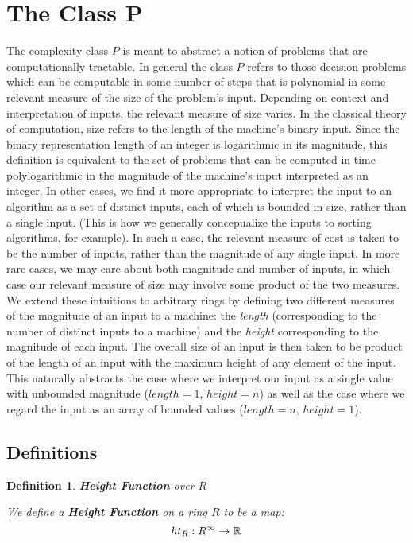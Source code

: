 \documentclass[twoside]{article}
\newtheorem{definition}{Definition}[section]
\begin{document}
\section{The Class P}

The complexity class $P$ is meant to abstract a notion of problems
that are computationally tractable.  In general the class $P$ refers
to those decision problems which can be computable in some number of
steps that is polynomial in some relevant measure of the size of the
problem's input.  Depending on context and interpretation of inputs,
the relevant measure of size varies. In the classical theory of
computation, size refers to the length of the machine's binary input.
Since the binary representation length of an integer is logarithmic in
its magnitude, this definition is equivalent to the set of problems
that can be computed in time polylogarithmic in the magnitude of the
machine's input interpreted as an integer.  In other cases, we find it
more appropriate to interpret the input to an algorithm as a set of
distinct inputs, each of which is bounded in size, rather than a
single input.  (This is how we generally concepualize the inputs to
sorting algorithms, for example).  In such a case, the relevant
measure of cost is taken to be the number of inputs, rather than the
magnitude of any single input.  In more rare cases, we may care about
both magnitude and number of inputs, in which case our relevant measure
of size may involve some product of the two measures.\\

We extend these intuitions to arbitrary rings by defining two
different measures of the magnitude of an input to a machine: the
\emph{length} (corresponding to the number of distinct inputs to a
machine) and the \emph{height} corresponding to the magnitude of each
input.  The overall size of an input is then taken to be product of
the length of an input with the maximum height of any element of the
input.  This naturally abstracts the case where we interpret our input
as a single value with unbounded magnitude ($length = 1$, $height =
n$) as well as the case where we regard the input as an array of
bounded values ($length = n$, $height = 1$).

\subsection{Definitions}

\begin{definition}{\textbf{Height Function} over $R$}

  We define a \textbf{Height Function} on a ring $R$ to be a map:
  $$ht_R:R^\infty \rightarrow \mathbb{R}$$
\end{definition}
\end{document}

